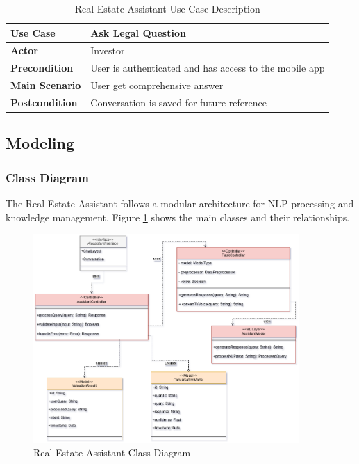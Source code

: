 \begin{table}[htbp]
    \centering
    \begin{tabular}{|p{3cm}|p{10cm}|}
        \hline
        \textbf{Use Case} & \textbf{Ask Legal Question} \\
        \hline
        \textbf{Actor} & Investor \\
        \hline
        \textbf{Precondition} & User is authenticated and has access to the mobile app \\
        \hline
        \textbf{Main Scenario} & User get comprehensive answer \\
        \hline
        \textbf{Postcondition} & Conversation is saved for future reference \\
        \hline
    \end{tabular}
    \caption{Real Estate Assistant Use Case Description}
    \label{tab:assistant-use-case}
\end{table}

\newpage

\subsection{Modeling}
\subsubsection{Class Diagram}
The Real Estate Assistant follows a modular architecture for NLP processing and knowledge management. Figure \ref{fig:assistant-class-diagram} shows the main classes and their relationships.

\begin{figure}[htbp]
    \centering
    \includegraphics[width=0.9\textwidth]{images/assistant_class_diagram.png}
    \caption{Real Estate Assistant Class Diagram}
    \label{fig:assistant-class-diagram}
\end{figure}


